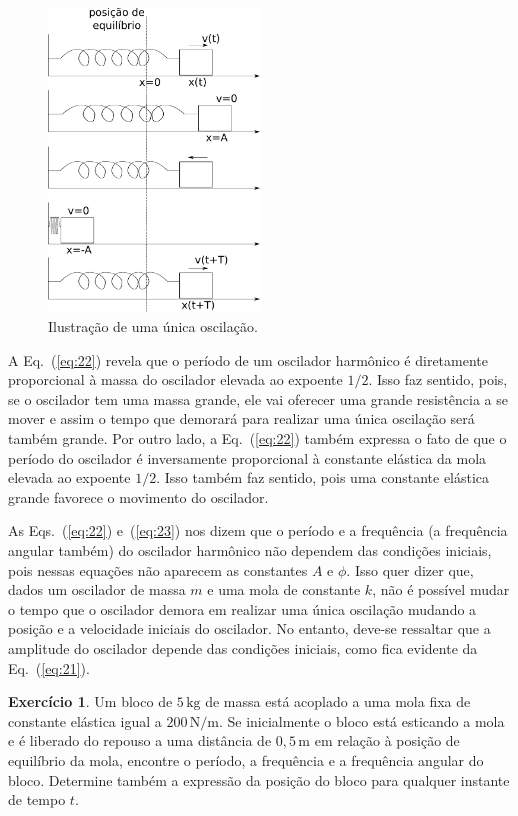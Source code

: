 \documentclass[12pt,a4paper]{article}
\theoremstyle{definition}
\newtheorem{ex}{Exercício}[section]
\begin{document}
\begin{figure}[t]
  \centering
  \includegraphics[width=0.5\textwidth,keepaspectratio]{aux/oscilador_periodo.pdf}
  \caption{Ilustração de uma única oscilação.}
  \label{fig:oscilador_periodo}
\end{figure}

A Eq.~(\ref{eq:22}) revela que o período de um oscilador harmônico é
diretamente proporcional à massa do oscilador elevada ao expoente
$1/2$. Isso faz sentido, pois, se o oscilador tem uma massa grande,
ele vai oferecer uma grande resistência a se mover e assim o tempo que
demorará para realizar uma única oscilação será também grande. Por
outro lado, a Eq.~(\ref{eq:22}) também expressa o fato de que o
período do oscilador é inversamente proporcional à constante elástica
da mola elevada ao expoente $1/2$. Isso também faz sentido, pois uma
constante elástica grande favorece o movimento do oscilador.

As Eqs.~(\ref{eq:22}) e~(\ref{eq:23}) nos dizem que o período e a
frequência (a frequência angular também) do oscilador harmônico não
dependem das condições iniciais, pois nessas equações não aparecem as
constantes $A$ e $\phi$. Isso quer dizer que, dados um oscilador de
massa $m$ e uma mola de constante $k$, não é possível mudar o tempo
que o oscilador demora em realizar uma única oscilação mudando a
posição e a velocidade iniciais do oscilador. No entanto, deve-se
ressaltar que a amplitude do oscilador depende das condições iniciais,
como fica evidente da Eq.~(\ref{eq:21}).

\begin{ex}
  Um bloco de $5\,\mathrm{kg}$ de massa está acoplado a uma mola fixa
  de constante elástica igual a $200\,\mathrm{N/m}$. Se inicialmente o
  bloco está esticando a mola e é liberado do repouso a uma distância
  de $0{,}5\,\mathrm{m}$ em relação à posição de equilíbrio da mola,
  encontre o período, a frequência e a frequência angular do
  bloco. Determine também a expressão da posição do bloco para
  qualquer instante de tempo $t$.
\end{ex}
\end{document}
